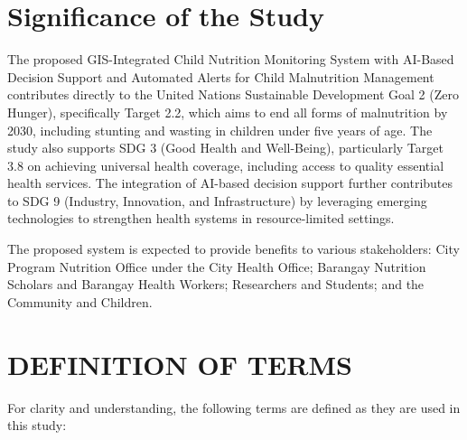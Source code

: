 \documentclass[12pt, a4paper]{report}
\begin{document}
\section{Significance of the Study}
\label{sec:significance}
The proposed GIS-Integrated Child Nutrition Monitoring System with AI-Based Decision Support and Automated Alerts for Child Malnutrition Management contributes directly to the United Nations Sustainable Development Goal 2 (Zero Hunger), specifically Target 2.2, which aims to end all forms of malnutrition by 2030, including stunting and wasting in children under five years of age. The study also supports SDG 3 (Good Health and Well-Being), particularly Target 3.8 on achieving universal health coverage, including access to quality essential health services. The integration of AI-based decision support further contributes to SDG 9 (Industry, Innovation, and Infrastructure) by leveraging emerging technologies to strengthen health systems in resource-limited settings.

The proposed system is expected to provide benefits to various stakeholders: City Program Nutrition Office under the City Health Office; Barangay Nutrition Scholars and Barangay Health Workers; Researchers and Students; and the Community and Children.

\section{DEFINITION OF TERMS}
\label{sec:definition}

For clarity and understanding, the following terms are defined as they are used in this study:
\end{document}
